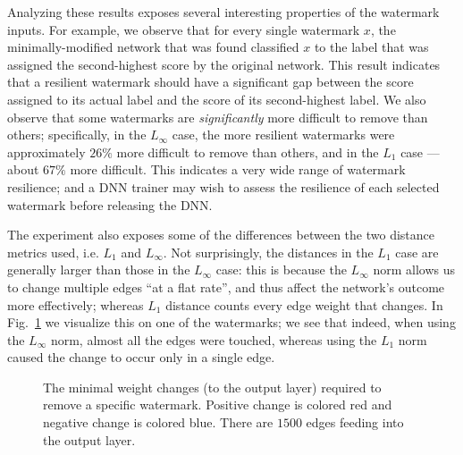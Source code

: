 \documentclass{easychair}
\begin{document}
Analyzing these results exposes several interesting properties of the
watermark inputs. For example, we observe 
that for every single watermark $x$, the minimally-modified network that
was found classified $x$ to the label that was assigned the second-highest score
 by the original network. This result indicates
that a resilient watermark should have a
significant gap between the score assigned to its actual label and
the score of its second-highest label. We also observe that some
watermarks are \emph{significantly} more difficult to remove than
others; specifically, in the $L_\infty$ case, the more resilient
watermarks were approximately $26\%$ more difficult to remove than
others, and in the $L_1$ case --- about $67\%$ more
difficult.
This indicates a very wide range of watermark resilience; and
a DNN trainer may wish to assess the resilience of each selected
watermark before releasing the DNN.


The experiment also exposes some of the differences between the two
distance metrics used, i.e. $L_1$ and $L_\infty$. Not surprisingly,
the distances in the $L_1$ case are generally larger than those in the
$L_\infty$ case: this is because the $L_\infty$ norm allows us to
change multiple edges ``at a flat rate'', and thus affect the
network's outcome more effectively; whereas $L_1$ distance counts
every edge weight that changes. In
Fig.~\ref{fig:lastLayerExampleSingle} we visualize this on one
of the watermarks; we see that indeed, when using the $L_\infty$ norm,
almost all the edges were touched, whereas using the $L_1$ norm caused the
change to occur only in a single edge.

 
\begin{figure}
  \centering
  \caption{The minimal weight changes (to the output layer) required
    to remove a specific watermark. Positive change is colored red and
    negative change is colored blue. There are $1500$ edges feeding
    into the output layer.}
  \label{fig:lastLayerExampleSingle}
\end{figure}
\end{document}
